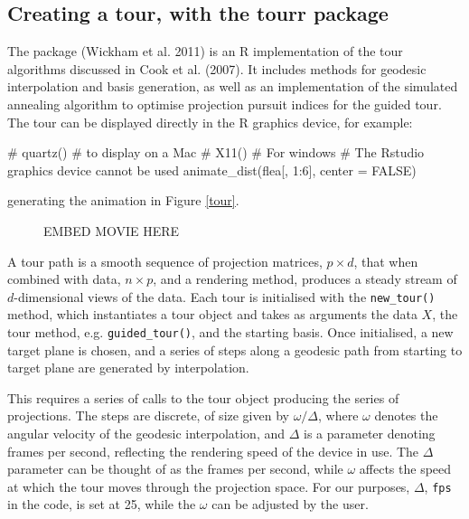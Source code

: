\subsection{Creating a tour, with the tourr
package}\label{creating-a-tour-with-the-tourr-package}

The  package (Wickham et al. 2011) is an R implementation of
the tour algorithms discussed in Cook et al. (2007). It includes methods
for geodesic interpolation and basis generation, as well as an
implementation of the simulated annealing algorithm to optimise
projection pursuit indices for the guided tour. The tour can be
displayed directly in the R graphics device, for example:

\begin{Schunk}
\begin{Sinput}
# quartz() # to display on a Mac
# X11() # For windows
# The Rstudio graphics device cannot be used
animate_dist(flea[, 1:6], center = FALSE)
\end{Sinput}
\end{Schunk}

generating the animation in Figure \ref{tour}.

\begin{figure}[ht]
EMBED MOVIE HERE
\end{figure}

A tour path is a smooth sequence of projection matrices, \(p\times d\),
that when combined with data, \(n\times p\), and a rendering method,
produces a steady stream of \(d\)-dimensional views of the data. Each
tour is initialised with the \texttt{new\_tour()} method, which
instantiates a tour object and takes as arguments the data \(X\), the
tour method, e.g. \texttt{guided\_tour()}, and the starting basis. Once
initialised, a new target plane is chosen, and a series of steps along a
geodesic path from starting to target plane are generated by
interpolation.

This requires a series of calls to the tour object producing the series
of projections. The steps are discrete, of size given by
\(\omega/\Delta\), where \(\omega\) denotes the angular velocity of the
geodesic interpolation, and \(\Delta\) is a parameter denoting frames
per second, reflecting the rendering speed of the device in use. The
\(\Delta\) parameter can be thought of as the frames per second, while
\(\omega\) affects the speed at which the tour moves through the
projection space. For our purposes, \(\Delta\), \texttt{fps} in the
code, is set at 25, while the \(\omega\) can be adjusted by the user.

